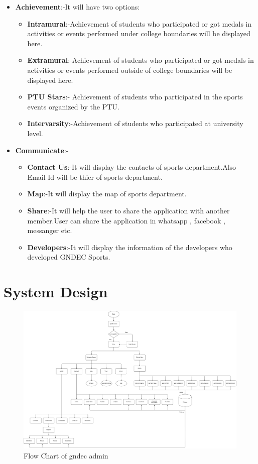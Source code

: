 \begin{itemize}
\begin{itemize}
			\item \textbf{Achievement}:-It will have two options:
			\begin{itemize} 
			\item \textbf{Intramural}:-Achievement of students who participated or got medals in activities or events performed under college boundaries will be displayed here.
			\item \textbf{Extramural}:-Achievement of students who participated or got medals in activities or events performed outside of college boundaries will be displayed here.
			\item \textbf{PTU Stars}:- Achievement of students who participated in the sports events organized by the PTU.
			  \item \textbf{Intervarsity}:-Achievement of students who participated at university level.
			
			
			\end{itemize}
			\item \textbf{Communicate}:-
			\begin{itemize} 
			\item \textbf{Contact Us}:-It will display the contacts of sports department.Also Email-Id will be thier of sports department. 
			\item \textbf{Map}:-It will display the map of sports department.
\item \textbf{Share}:-It will help the user to share the application with another member.User can share the application in whatsapp , facebook , messanger etc.
\item \textbf{Developers}:-It will display the information of the developers who developed GNDEC Sports.  			
			
			\end{itemize}
			
		\end{itemize}
	\end{itemize}
\newpage
\section{System Design}

\begin{figure}[ht]
	
	\includegraphics[scale=0.26]{images/Gndecadmingne.png}
	\caption{Flow Chart of gndec admin}
\end{figure}

